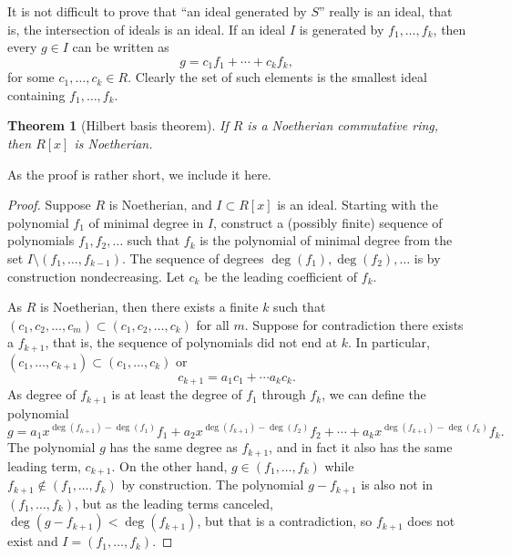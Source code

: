 \documentclass[12pt,openany]{book}
\theoremstyle{plain}
\newtheorem{thm}{Theorem}[section]
\theoremstyle{remark}
\theoremstyle{definition}
\theoremstyle{exercise}
\theoremstyle{example}
\begin{document}
It is not difficult to prove that ``an ideal generated by $S$'' really is
an ideal, that is, the intersection of ideals is an ideal.
If an ideal $I$ is generated by $f_1,\ldots,f_k$, then every
$g \in I$ can be written as
\begin{equation*}
g = c_1 f_1 + \cdots + c_k f_k,
\end{equation*}
for some $c_1,\ldots,c_k \in R$.  Clearly the set of such elements is
the smallest ideal containing $f_1,\ldots,f_k$.

\begin{thm}[Hilbert basis theorem] \label{thm:hilbertbasis}
%
If $R$ is a Noetherian commutative ring, then $R[x]$ is Noetherian.
\end{thm}

As the proof is rather short, we include it here.

\begin{proof}
Suppose $R$ is Noetherian, and
$I \subset R[x]$ is an ideal.
Starting with the polynomial $f_1$ of minimal degree in $I$,
construct a (possibly finite) sequence of polynomials $f_1,f_2,\ldots$
such that $f_k$ is the polynomial of minimal degree
from the set $I \setminus (f_1,\ldots,f_{k-1})$.
The sequence of degrees $\deg(f_1),\deg(f_2),\ldots$ is by construction
nondecreasing.
Let $c_k$ be the leading coefficient of $f_k$.

As $R$ is Noetherian, then there exists a finite $k$ such
that $(c_1,c_2,\ldots,c_m) \subset (c_1,c_2,\ldots,c_k)$ for all $m$.
Suppose for contradiction there exists a $f_{k+1}$, that is, the sequence
of polynomials
did not end at $k$.  In particular,
$(c_1,\ldots,c_{k+1}) \subset (c_1,\ldots,c_k)$ or
\begin{equation*}
c_{k+1} = a_1 c_1 + \cdots a_k c_k .
\end{equation*}
As degree of $f_{k+1}$ is at least the degree of $f_1$ through $f_k$,
we can define the polynomial
\begin{equation*}
g =
a_1 x^{\deg(f_{k+1})-\deg(f_1)} f_1
+
a_2 x^{\deg(f_{k+1})-\deg(f_2)} f_2
+
\cdots
+
a_k x^{\deg(f_{k+1})-\deg(f_k)} f_k .
\end{equation*}
The polynomial $g$ has the same degree as $f_{k+1}$,
and in fact it also has the same leading term,
$c_{k+1}$.  On the other hand, $g \in (f_1,\ldots,f_{k})$ while
$f_{k+1} \notin (f_1,\ldots,f_k)$ by construction.  The polynomial
$g-f_{k+1}$ is also not in
$(f_1,\ldots,f_k)$, but as the leading terms canceled,
$\deg(g-f_{k+1}) < \deg(f_{k+1})$, but that is a contradiction, so $f_{k+1}$
does not exist and
$I = (f_1,\ldots,f_k)$.
\end{proof}
\end{document}
